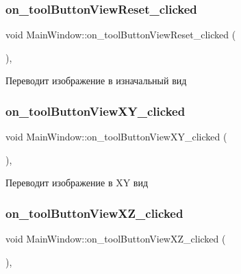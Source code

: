 \subsubsection{\texorpdfstring{on\+\_\+tool\+Button\+View\+Reset\+\_\+clicked}{on\_toolButtonViewReset\_clicked}}
{\footnotesize\ttfamily void Main\+Window\+::on\+\_\+tool\+Button\+View\+Reset\+\_\+clicked (\begin{DoxyParamCaption}{ }\end{DoxyParamCaption})\hspace{0.3cm}{\ttfamily [private]}, {\ttfamily [slot]}}

Переводит изображение в изначальный вид \mbox{\label{class_main_window_a8f31a3e693f087eb17c8ea48e4e2ee74}} 
\subsubsection{\texorpdfstring{on\+\_\+tool\+Button\+View\+X\+Y\+\_\+clicked}{on\_toolButtonViewXY\_clicked}}
{\footnotesize\ttfamily void Main\+Window\+::on\+\_\+tool\+Button\+View\+X\+Y\+\_\+clicked (\begin{DoxyParamCaption}{ }\end{DoxyParamCaption})\hspace{0.3cm}{\ttfamily [private]}, {\ttfamily [slot]}}

Переводит изображение в XY вид \mbox{\label{class_main_window_a3f9c5595b9d72fcd58d5b1057d74a171}} 
\subsubsection{\texorpdfstring{on\+\_\+tool\+Button\+View\+X\+Z\+\_\+clicked}{on\_toolButtonViewXZ\_clicked}}
{\footnotesize\ttfamily void Main\+Window\+::on\+\_\+tool\+Button\+View\+X\+Z\+\_\+clicked (\begin{DoxyParamCaption}{ }\end{DoxyParamCaption})\hspace{0.3cm}{\ttfamily [private]}, {\ttfamily [slot]}}

